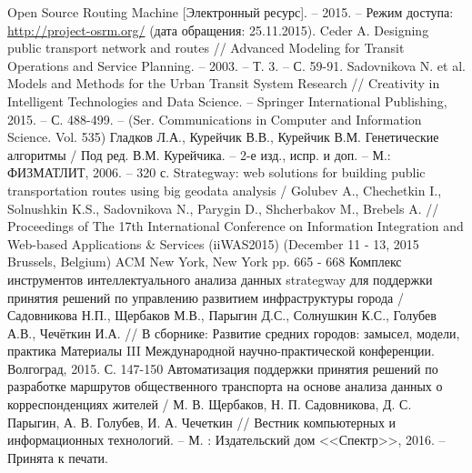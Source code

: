 \begin{thebibliography}{10}
     Open Source Routing Machine [Электронный ресурс]. -- 2015. -- Режим доступа: 
        \url{http://project-osrm.org/} (дата обращения: 25.11.2015).
     Ceder A. Designing public transport network and routes //
        Advanced Modeling for Transit Operations and Service Planning. -- 2003. -- Т. 3. -- С. 59-91.
     Sadovnikova N. et al. Models and Methods for the Urban Transit System Research //
        Creativity in Intelligent Technologies and Data Science. -- Springer International Publishing, 
        2015. -- С. 488-499. -- (Ser. Communications in Computer and Information Science. Vol. 535)
     Гладков Л.А., Курейчик В.В., Курейчик В.М. Генетические алгоритмы / 
        Под ред. В.М. Курейчика. -- 2-е изд., испр. и доп. -- М.: ФИЗМАТЛИТ, 2006. -- 320 с.
     Strategway: web solutions for building public transportation routes using big geodata 
        analysis / Golubev A., Chechetkin I., Solnushkin K.S., Sadovnikova N., Parygin D., Shcherbakov M., 
        Brebels A. // Proceedings of The 17th International Conference on Information Integration and 
        Web-based Applications \& Services (iiWAS2015) (December 11 - 13, 2015 Brussels, Belgium) 
        ACM New York, New York pp. 665 - 668
     Комплекс инструментов интеллектуального анализа данных strategway для поддержки 
        принятия решений по управлению развитием инфраструктуры города / Садовникова Н.П., Щербаков М.В., 
        Парыгин Д.С., Солнушкин К.С., Голубев А.В., Чечёткин И.А. // В сборнике: Развитие средних 
        городов: замысел, модели, практика Материалы III Международной научно-практической конференции. 
        Волгоград, 2015. С. 147-150
     Автоматизация поддержки принятия решений по разработке маршрутов общественного 
        транспорта на основе анализа данных о корреспонденциях жителей / М. В. Щербаков, 
        Н. П. Садовникова, Д. С. Парыгин, А. В. Голубев, И. А. Чечеткин // Вестник компьютерных и 
        информационных технологий. -- М. : Издательский дом <<Спектр>>, 2016. -- Принята к печати.



\end{thebibliography}
